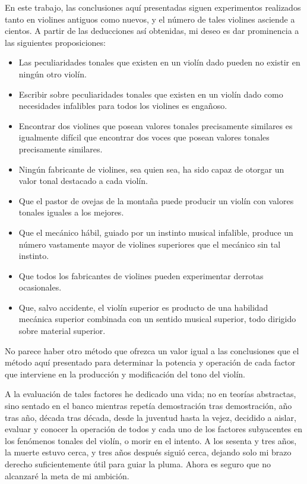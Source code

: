 En este trabajo, las conclusiones aquí presentadas siguen experimentos realizados tanto en violines antiguos como nuevos, y el número de tales violines asciende a cientos. A partir de las deducciones así obtenidas, mi deseo es dar prominencia a las siguientes proposiciones:
\begin{itemize}
 \item Las peculiaridades tonales que existen en un violín dado pueden no existir en ningún otro violín.
 \item Escribir sobre peculiaridades tonales que existen en un violín dado como necesidades infalibles para todos los violines es engañoso.
 \item Encontrar dos violines que posean valores tonales precisamente similares es igualmente difícil que encontrar dos voces que posean valores tonales precisamente similares.
 \item Ningún fabricante de violines, sea quien sea, ha sido capaz de otorgar un valor tonal destacado a cada violín.
 \item Que el pastor de ovejas de la montaña puede producir un violín con valores tonales iguales a los mejores.
 \item Que el mecánico hábil, guiado por un instinto musical infalible, produce un número vastamente mayor de violines superiores que el mecánico sin tal instinto.
 \item Que todos los fabricantes de violines pueden experimentar derrotas ocasionales.
 \item Que, salvo accidente, el violín superior es producto de una habilidad mecánica superior combinada con un sentido musical superior, todo dirigido sobre material superior.
\end{itemize}
No parece haber otro método que ofrezca un valor igual a las conclusiones que el método aquí presentado para determinar la potencia y operación de cada factor que interviene en la producción y modificación del tono del violín.

A la evaluación de tales factores he dedicado una vida; no en teorías abstractas, sino sentado en el banco mientras repetía demostración tras demostración, año tras año, década tras década, desde la juventud hasta la vejez, decidido a aislar, evaluar y conocer la operación de todos y cada uno de los factores subyacentes en los fenómenos tonales del violín, o morir en el intento. A los sesenta y tres años, la muerte estuvo cerca, y tres años después siguió cerca, dejando solo mi brazo derecho suficientemente útil para guiar la pluma. Ahora es seguro que no alcanzaré la meta de mi ambición.

